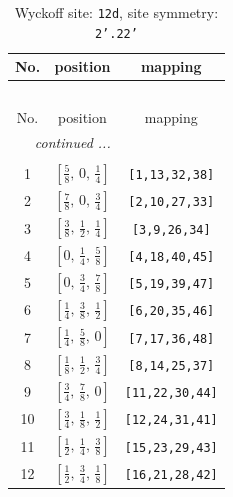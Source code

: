 \documentclass[fleqn,8pt]{jsarticle}
\begin{document}
\begin{longtable}{ccc}
\caption{Wyckoff site: {\tt 12d}, site symmetry: {\tt 2'.22'}}
 \\
 \hline \hline
No. & position & mapping \\ \hline \endfirsthead

\multicolumn{2}{l}{\tablename\ \thetable{}} \\
 \hline \hline
No. & position & mapping \\ \hline \endhead

 \hline \hline
\multicolumn{2}{r}{\footnotesize\it continued ...} \\ \endfoot

 \hline \hline
\multicolumn{2}{r}{} \\ \endlastfoot

1 & $\left[ \frac{5}{8},\, 0,\, \frac{1}{4} \right]$ & {\tt [1,13,32,38]} \\ \hline
2 & $\left[ \frac{7}{8},\, 0,\, \frac{3}{4} \right]$ & {\tt [2,10,27,33]} \\ \hline
3 & $\left[ \frac{3}{8},\, \frac{1}{2},\, \frac{1}{4} \right]$ & {\tt [3,9,26,34]} \\ \hline
4 & $\left[ 0,\, \frac{1}{4},\, \frac{5}{8} \right]$ & {\tt [4,18,40,45]} \\ \hline
5 & $\left[ 0,\, \frac{3}{4},\, \frac{7}{8} \right]$ & {\tt [5,19,39,47]} \\ \hline
6 & $\left[ \frac{1}{4},\, \frac{3}{8},\, \frac{1}{2} \right]$ & {\tt [6,20,35,46]} \\ \hline
7 & $\left[ \frac{1}{4},\, \frac{5}{8},\, 0 \right]$ & {\tt [7,17,36,48]} \\ \hline
8 & $\left[ \frac{1}{8},\, \frac{1}{2},\, \frac{3}{4} \right]$ & {\tt [8,14,25,37]} \\ \hline
9 & $\left[ \frac{3}{4},\, \frac{7}{8},\, 0 \right]$ & {\tt [11,22,30,44]} \\ \hline
10 & $\left[ \frac{3}{4},\, \frac{1}{8},\, \frac{1}{2} \right]$ & {\tt [12,24,31,41]} \\ \hline
11 & $\left[ \frac{1}{2},\, \frac{1}{4},\, \frac{3}{8} \right]$ & {\tt [15,23,29,43]} \\ \hline
12 & $\left[ \frac{1}{2},\, \frac{3}{4},\, \frac{1}{8} \right]$ & {\tt [16,21,28,42]} \\
\end{longtable}
\renewcommand{\arraystretch}{1.2}
\end{document}
